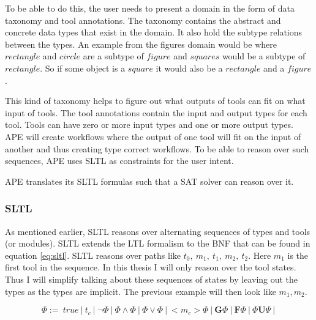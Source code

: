 \documentclass{article}
\begin{document}
To be able to do this, the user needs to present a domain in the form of data taxonomy and tool annotations. The taxonomy contains the abstract and concrete data types that exist in the domain. It also hold the subtype relations between the types. An example from the figures domain would be where $rectangle$ and $circle$ are a subtype of $figure$ and $squares$ would be a subtype of $rectangle$. So if some object is a $square$ it would also be a $rectangle$ and a $figure$. 

This kind of taxonomy helps to figure out what outputs of tools can fit on what input of tools. The tool annotations contain the input and output types for each tool. Tools can have zero or more input types and one or more output types. APE will create workflows where the output of one tool will fit on the input of another and thus creating type correct workflows. To be able to reason over such sequences, APE uses SLTL as constraints for the user intent. 

APE translates its SLTL formulas such that a SAT solver can reason over it.



\subsubsection{SLTL}

As mentioned earlier, SLTL reasons over alternating sequences of types and tools (or modules). SLTL extends the LTL formalism to the BNF that can be found in equation \ref{eq:sltl}. SLTL reasons over paths like $t_0,\ m_1,\ t_1,\ m_2,\ t_2$. Here $m_1$ is the first tool in the sequence. In this thesis I will only reason over the tool states. Thus I will simplify talking about these sequences of states by leaving out the types as the types are implicit. The previous example will then look like $m_1, m_2$.



\begin{equation}
    \Phi :=\ true\ |\ t_c\ |\ \neg \Phi\ |\ \Phi \wedge \Phi\ |\ \Phi \vee \Phi\ |\ <m_c> \Phi\ |\  \textbf{G} \Phi\ |\ \textbf{F} \Phi\ |\  \Phi \textbf{U} \Psi\ |\  \label{eq:sltl}
\end{equation} 
\end{document}
